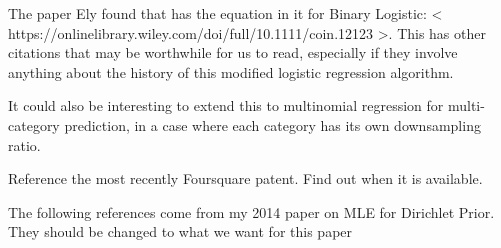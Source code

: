 \documentclass[twoside]{article}
\begin{document}
The paper Ely found that has the equation in it for Binary Logistic: < https://onlinelibrary.wiley.com/doi/full/10.1111/coin.12123 >. This has other citations that may be worthwhile for us to read, especially if they involve anything about the history of this modified logistic regression algorithm.

It could also be interesting to extend this to multinomial regression for multi-category prediction, in a case where each category has its own downsampling ratio.

Reference the most recently Foursquare patent. Find out when it is available.

The following references come from my 2014 paper on MLE for Dirichlet Prior. They should be changed to what we want for this paper

\end{document}
